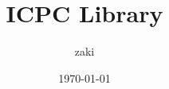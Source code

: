 \documentclass[titlepage, landscape, a4paper, twocolumn, 12pt]{jarticle}
\begin{document}
\title{ICPC Library}
\author{zaki}
\date{\today}

\maketitle








\end{document}
